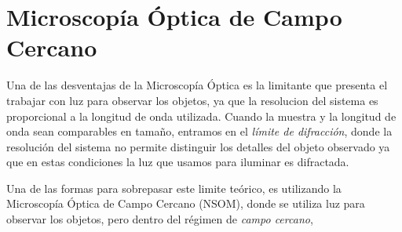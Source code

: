 \section{Microscopía Óptica de Campo Cercano}
\label{sec:chap3-NSOM}

Una de las desventajas de la Microscopía Óptica es la limitante que presenta el trabajar con luz para observar los objetos, ya que la resolucion del sistema es proporcional a la longitud de onda utilizada. Cuando la muestra y la longitud de onda sean comparables en tamaño, entramos en el \textit{límite de difracción}, donde la resolución del sistema no permite distinguir los detalles del objeto observado ya que en estas condiciones la luz que usamos para iluminar es difractada.

Una de las formas para sobrepasar este limite teórico, es utilizando la Microscopía Óptica de Campo Cercano (NSOM), donde se utiliza luz para observar los objetos, pero dentro del régimen de \textit{campo cercano},